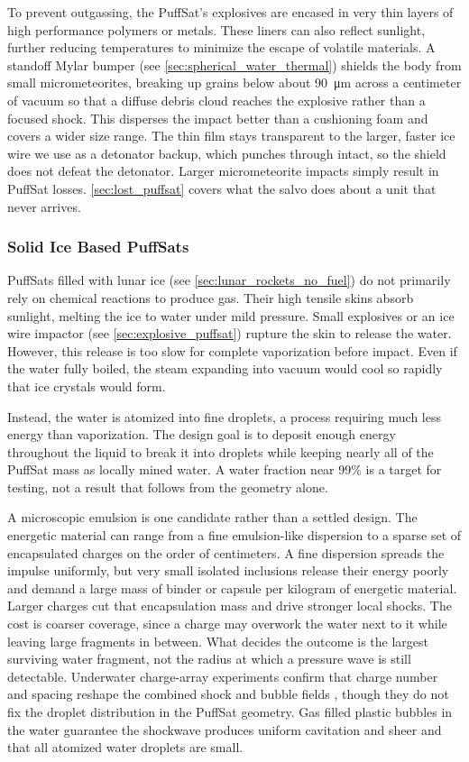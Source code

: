 \documentclass{article}
\begin{document}
To prevent outgassing, the PuffSat's explosives are encased in very thin layers of high performance polymers or metals. These liners can also reflect sunlight, further reducing temperatures to minimize the escape of volatile materials. A standoff Mylar bumper (see \autoref{sec:spherical_water_thermal}) shields the body from small micrometeorites, breaking up grains below about \SI{90}{\micro\meter} across a centimeter of vacuum so that a diffuse debris cloud reaches the explosive rather than a focused shock. This disperses the impact better than a cushioning foam and covers a wider size range. The thin film stays transparent to the larger, faster ice wire we use as a detonator backup, which punches through intact, so the shield does not defeat the detonator. Larger micrometeorite impacts simply result in PuffSat losses. \autoref{sec:lost_puffsat} covers what the salvo does about a unit that never arrives.

\subsubsection{Solid Ice Based PuffSats} \label{sec:icy_puffsat}
PuffSats filled with lunar ice (see \autoref{sec:lunar_rockets_no_fuel}) do not primarily rely on chemical reactions to produce gas. Their high tensile skins absorb sunlight, melting the ice to water under mild pressure. Small explosives or an ice wire impactor (see \autoref{sec:explosive_puffsat}) rupture the skin to release the water. However, this release is too slow for complete vaporization before impact. Even if the water fully boiled, the steam expanding into vacuum would cool so rapidly that ice crystals would form.

Instead, the water is atomized into fine droplets, a process requiring much less energy than vaporization. The design goal is to deposit enough energy throughout the liquid to break it into droplets while keeping nearly all of the PuffSat mass as locally mined water. A water fraction near 99\% is a target for testing, not a result that follows from the geometry alone.

A microscopic emulsion is one candidate rather than a settled design. The energetic material can range from a fine emulsion-like dispersion to a sparse set of encapsulated charges on the order of centimeters. A fine dispersion spreads the impulse uniformly, but very small isolated inclusions release their energy poorly and demand a large mass of binder or capsule per kilogram of energetic material. Larger charges cut that encapsulation mass and drive stronger local shocks. The cost is coarser coverage, since a charge may overwork the water next to it while leaving large fragments in between. What decides the outcome is the largest surviving water fragment, not the radius at which a pressure wave is still detectable. Underwater charge-array experiments confirm that charge number and spacing reshape the combined shock and bubble fields \cite{hu2022_underwater_array}, though they do not fix the droplet distribution in the PuffSat geometry. Gas filled plastic bubbles in the water guarantee the shockwave produces uniform cavitation and sheer and that all atomized water droplets are small.  
\end{document}
